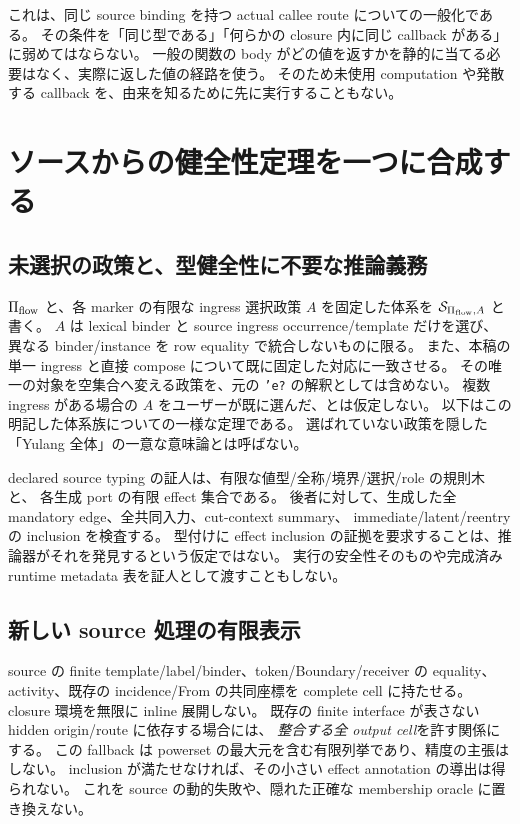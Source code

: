 \documentclass[11pt,a4paper]{article}
\newcommand{\Src}{\mathcal S}
\begin{document}
これは、同じ source binding を持つ actual callee route についての一般化である。
その条件を「同じ型である」「何らかの closure 内に同じ callback がある」に弱めてはならない。
一般の関数の body がどの値を返すかを静的に当てる必要はなく、実際に返した値の経路を使う。
そのため未使用 computation や発散する callback を、由来を知るために先に実行することもない。

\section{ソースからの健全性定理を一つに合成する}
\label{sec:source-family}

\subsection{未選択の政策と、型健全性に不要な推論義務}

\(\Pi_{\rm flow}\) と、各 marker の有限な ingress 選択政策 \(A\) を固定した体系を
\(\Src_{\Pi_{\rm flow},A}\) と書く。
\(A\) は lexical binder と source ingress occurrence/template だけを選び、
異なる binder/instance を row equality で統合しないものに限る。
また、本稿の単一 ingress と直接 compose について既に固定した対応に一致させる。
その唯一の対象を空集合へ変える政策を、元の \texttt{'e?} の解釈としては含めない。
複数 ingress がある場合の \(A\) をユーザーが既に選んだ、とは仮定しない。
以下はこの明記した体系族についての一様な定理である。
選ばれていない政策を隠した「Yulang 全体」の一意な意味論とは呼ばない。

declared source typing の証人は、有限な値型/全称/境界/選択/role の規則木と、
各生成 port の有限 effect 集合である。
後者に対して、生成した全 mandatory edge、全共同入力、cut-context summary、
immediate/latent/reentry の inclusion を検査する。
型付けに effect inclusion の証拠を要求することは、推論器がそれを発見するという仮定ではない。
実行の安全性そのものや完成済み runtime metadata 表を証人として渡すこともしない。

\subsection{新しい source 処理の有限表示}

source の finite template/label/binder、token/Boundary/receiver の equality、
activity、既存の incidence/From の共同座標を complete cell に持たせる。
closure 環境を無限に inline 展開しない。
既存の finite interface が表さない hidden origin/route に依存する場合には、
\emph{整合する全 output cell}を許す関係にする。
この fallback は powerset の最大元を含む有限列挙であり、精度の主張はしない。
inclusion が満たせなければ、その小さい effect annotation の導出は得られない。
これを source の動的失敗や、隠れた正確な membership oracle に置き換えない。
\end{document}
